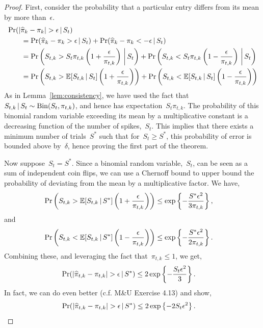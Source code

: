 \begin{proof}
First, consider the probability that a particular entry differs from its mean by more than~$\epsilon$.
\begin{align}
  &\Pr(|\widehat{\pi}_k - \pi_k |  > \epsilon \,|\, S_t) \\
  &\qquad= \Pr(\widehat{\pi}_k - \pi_k  > \epsilon \,|\, S_t) + 
  \Pr(\widehat{\pi}_k - \pi_k  < -\epsilon \,|\, S_t) \\
  &\qquad= \Pr \left(S_{t, k} > S_t \pi_{t, k} \left(1+\frac{\epsilon}{\pi_{t, k}} \right) \, \bigg| \, S_t \right) 
  +\Pr \left(S_{t, k} < S_t \pi_{t, k} \left(1-\frac{\epsilon}{\pi_{t, k}} \right) \, \bigg| \, S_t\right) \\
  &\qquad= \Pr \left(S_{t, k} > \mathbb{E}[S_{t,k} \,|\, S_t] \left(1+\frac{\epsilon}{\pi_{t, k}} \right) \right) 
   +\Pr \left(S_{t, k} < \mathbb{E}[S_{t,k} \,|\, S_t] \left(1-\frac{\epsilon}{\pi_{t, k}} \right) \right)
\end{align}
As in Lemma~\ref{lem:consistency}, we have used the fact
that~$S_{t, k} \,|\, S_t \sim \mathrm{Bin}(S_t, \pi_{t, k})$,
and hence has expectation~$S_t \pi_{t, k}$. 
The probability of this binomial random variable exceeding its mean 
by a multiplicative constant is a decreasing function of the 
number of spikes,~$S_t$. This implies that there exists a minimum 
number of trials~$S^*$ such that for~$S_t \geq S^*$, this probability 
of error is bounded above by~$\delta$, hence proving the first part 
of the theorem.

Now suppose~$S_t=S^*$. Since a binomial random variable,~$S_{t}$, can be seen
as a sum of independent coin flips, we can use a Chernoff bound to
upper bound the probability of deviating from the mean by a
multiplicative factor. We
have,
\begin{align}
  \Pr \left(S_{t,k} > \mathbb{E}[S_{t,k} \,|\, S^*] \left(1+\frac{\epsilon}{\pi_{t,k}} \right) \right) 
  &\leq \exp \left \{- \frac{S^* \epsilon^2}{3 \pi_{t,k}} \right \},
\end{align}
and
\begin{align}
  \Pr \left(S_{t,k} < \mathbb{E}[S_{t,k} \,|\, S^*] \left(1-\frac{\epsilon}{\pi_{t,k}} \right) \right) 
  &\leq \exp \left \{- \frac{S^* \epsilon^2}{2 \pi_{t,k}} \right \}.
\end{align}
Combining these, and leveraging the fact that~$\pi_{t,k} \leq 1$, we get,
\begin{align}
  \Pr(|\widehat{\pi}_{t,k} - \pi_{t,k} |  > \epsilon \,|\, S^*) 
  & \leq 2 \exp \left \{- \frac{S_t \epsilon^2}{3} \right \}.
\end{align}
In fact, we can do even better (c.f. M\&U Exercise 4.13) and show,
\begin{align}
  \Pr(|\widehat{\pi}_{t,k} - \pi_{t,k} |  > \epsilon \,|\, S^*) 
  &\leq 2 \exp \left \{-2S_t \epsilon^2 \right \}.
\end{align}


\end{proof}
